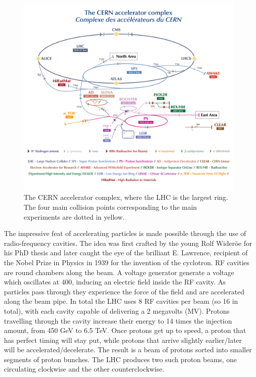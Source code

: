 \begin{figure}
  \includegraphics[width=\mediumfigwidth]{Figures/LHC/CernAcceleratorComplex.png}
  \caption[The \CERN accelerator complex]%
  {The CERN accelerator complex, where the LHC is the largest ring. The four main collision points corresponding to the main experiments are dotted in yellow.}
  \label{fig:CERNComplex}
\end{figure}

The impressive feat of accelerating particles is made possible through the use of radio-frequency cavities. The idea was first crafted by the young Rolf Wideröe \cite{vretenar2012radio} for his PhD thesis and later caught the eye of the brilliant E. Lawrence, recipient of the Nobel Prize in Physics in 1939 for the invention of the cyclotron. RF cavities are round chambers along the beam. A voltage generator generate a voltage which oscillates at \unit{400}{\mega\hertz}, inducing an electric field inside the RF cavity. As particles pass through they experience the force of the field and are accelerated along the beam pipe. In total the LHC uses 8 RF cavities per beam (so 16 in total), with each cavity capable of delivering a 2 megavolts (MV). Protons travelling through the cavity increase their energy to 14 times the injection amount, from 450 GeV to 6.5 TeV. Once protons get up to speed, a proton that has perfect timing will stay put, while protons that arrive slightly earlier/later will be accelerated/decelerate. The result is a beam of protons sorted into smaller segments of proton bunches. The LHC produces two such proton beams, one circulating clockwise and the other counterclockwise. 

